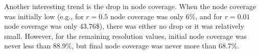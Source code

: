\documentclass[11pt]{article}   	%
\begin{document}
Another interesting trend is the drop in node coverage. 
When the node coverage was initially low (e.g., for $r=0.5$ node coverage was only 6\%, and for $r=0.01$ node coverage was only 43.76\$), there was either no drop or it was relatively small.
However, for the remaining resolution values, initial node coverage was never less than 88.9\%, but final node coverage was 
 never more than 68.7\%. 
\end{document}
